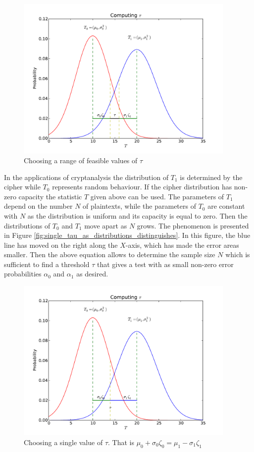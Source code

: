 \begin{figure}[h!]
    \centering
    \includegraphics[width=\textwidth , height = 8cm]{images/feasible_range_of_tau}
    \caption{Choosing a range of feasible values of $\tau$}
    \label{fig:single_tau_range}
\end{figure}
In the applications of cryptanalysis the distribution of $T_1$ is determined by the cipher while $T_0$ represents random behaviour. If the cipher distribution has non-zero capacity the statistic $T$ given above can be used. The parameters of $T_1$ depend on the number $N$ of plaintexts, while the parameters of $T_0$ are constant with $N$ as the distribution is uniform and its capacity is equal to zero. Then the distributions of $T_0$ and $T_1$ move apart as $N$ grows. The phenomenon is presented in Figure \ref{fig:single_tau_as_distributions_distinguishes}. In this figure, the blue line has moved on the right along the $X$-axis, which has made the error areas smaller. Then the above equation allows to determine the sample size $N$ which is sufficient to find a threshold $\tau$ that gives a test with as small non-zero error probabilities $\alpha_0$ and $\alpha_1$ as desired.
\begin{figure}[h!]
    \centering
    \includegraphics[width=\textwidth , height = 8cm]{images/single_tau}
    \caption{Choosing a single value of $\tau$. That is $\mu_0+\sigma_0\zeta_0 = \mu_1 - \sigma_1\zeta_1$}
    \label{fig:single_tau}
\end{figure}
